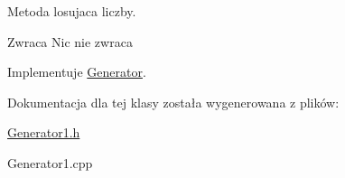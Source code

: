 Metoda losujaca liczby. 

\begin{DoxyReturn}{Zwraca}
Nic nie zwraca 
\end{DoxyReturn}


Implementuje \hyperlink{classGenerator_ace6b7b9d7b8afcf8a980277dee90d04b}{Generator}.



Dokumentacja dla tej klasy została wygenerowana z plików\+:\begin{DoxyCompactItemize}
\item 
\hyperlink{Generator1_8h}{Generator1.\+h}\item 
Generator1.\+cpp\end{DoxyCompactItemize}
